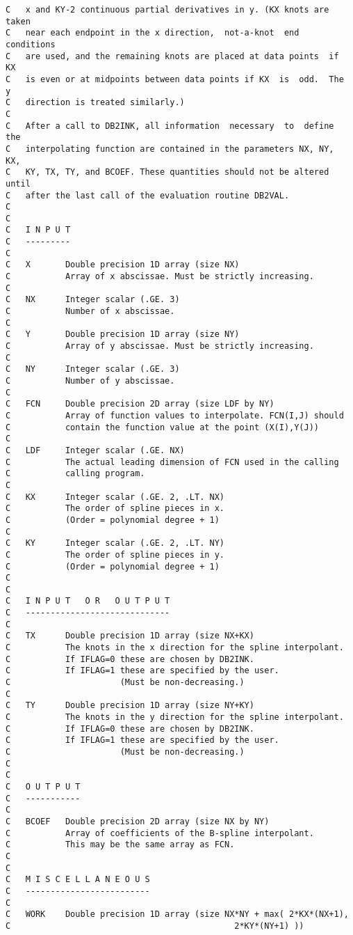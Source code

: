 \begin{verbatim}
C   x and KY-2 continuous partial derivatives in y. (KX knots are taken
C   near each endpoint in the x direction,  not-a-knot  end  conditions
C   are used, and the remaining knots are placed at data points  if  KX
C   is even or at midpoints between data points if KX  is  odd.  The  y
C   direction is treated similarly.)
C
C   After a call to DB2INK, all information  necessary  to  define  the
C   interpolating function are contained in the parameters NX, NY,  KX,
C   KY, TX, TY, and BCOEF. These quantities should not be altered until
C   after the last call of the evaluation routine DB2VAL.
C
C
C   I N P U T
C   ---------
C
C   X       Double precision 1D array (size NX)
C           Array of x abscissae. Must be strictly increasing.
C
C   NX      Integer scalar (.GE. 3)
C           Number of x abscissae.
C
C   Y       Double precision 1D array (size NY)
C           Array of y abscissae. Must be strictly increasing.
C
C   NY      Integer scalar (.GE. 3)
C           Number of y abscissae.
C
C   FCN     Double precision 2D array (size LDF by NY)
C           Array of function values to interpolate. FCN(I,J) should
C           contain the function value at the point (X(I),Y(J))
C
C   LDF     Integer scalar (.GE. NX)
C           The actual leading dimension of FCN used in the calling
C           calling program.
C
C   KX      Integer scalar (.GE. 2, .LT. NX)
C           The order of spline pieces in x.
C           (Order = polynomial degree + 1)
C
C   KY      Integer scalar (.GE. 2, .LT. NY)
C           The order of spline pieces in y.
C           (Order = polynomial degree + 1)
C
C
C   I N P U T   O R   O U T P U T
C   -----------------------------
C
C   TX      Double precision 1D array (size NX+KX)
C           The knots in the x direction for the spline interpolant.
C           If IFLAG=0 these are chosen by DB2INK.
C           If IFLAG=1 these are specified by the user.
C                      (Must be non-decreasing.)
C
C   TY      Double precision 1D array (size NY+KY)
C           The knots in the y direction for the spline interpolant.
C           If IFLAG=0 these are chosen by DB2INK.
C           If IFLAG=1 these are specified by the user.
C                      (Must be non-decreasing.)
C
C
C   O U T P U T
C   -----------
C
C   BCOEF   Double precision 2D array (size NX by NY)
C           Array of coefficients of the B-spline interpolant.
C           This may be the same array as FCN.
C
C
C   M I S C E L L A N E O U S
C   -------------------------
C
C   WORK    Double precision 1D array (size NX*NY + max( 2*KX*(NX+1),
C                                             2*KY*(NY+1) ))

\end{verbatim}

